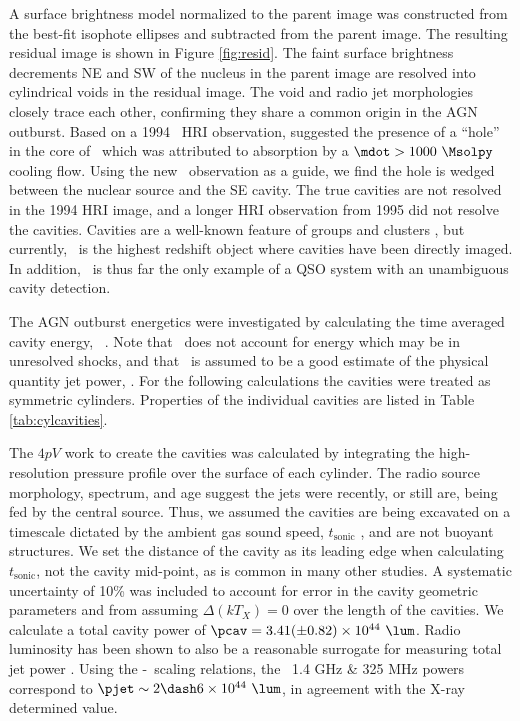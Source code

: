 \documentclass[useAMS,usenatbib]{mn2e}
\begin{document}
A surface brightness model normalized to the parent image was
constructed from the best-fit isophote ellipses and subtracted from
the parent image. The resulting residual image is shown in Figure
\ref{fig:resid}. The faint surface brightness decrements NE and SW of
the nucleus in the parent image are resolved into cylindrical voids in
the residual image. The void and radio jet morphologies closely trace
each other, confirming they share a common origin in the AGN
outburst. Based on a 1994 \rosat\ HRI observation,
\citet{1995MNRAS.274L..63F} suggested the presence of a ``hole'' in
the core of \rxj\ which was attributed to absorption by a $\mdot >
1000 ~\Msolpy$ cooling flow. Using the new \chandra\ observation as a
guide, we find the hole is wedged between the nuclear source and the
SE cavity. The true cavities are not resolved in the 1994 HRI image,
and a longer HRI observation from 1995 did not resolve the
cavities. Cavities are a well-known feature of groups and clusters
\citep[\eg][]{birzan04, 2005MNRAS.364.1343D}, but currently, \irs\ is
the highest redshift object where cavities have been directly
imaged. In addition, \irs\ is thus far the only example of a QSO
system with an unambiguous cavity detection.

The AGN outburst energetics were investigated by calculating the time
averaged cavity energy, \pcav\ \citep[see][for a
  review]{mcnamrev}. Note that \pcav\ does not account for energy
which may be in unresolved shocks, and that \pcav\ is assumed to be a
good estimate of the physical quantity jet power, \pjet. For the
following calculations the cavities were treated as symmetric
cylinders. Properties of the individual cavities are listed in Table
\ref{tab:cylcavities}.

The $4pV$ work to create the cavities was calculated by integrating
the high-resolution pressure profile over the surface of each
cylinder. The radio source morphology, spectrum, and age suggest the
jets were recently, or still are, being fed by the central
source. Thus, we assumed the cavities are being excavated on a
timescale dictated by the ambient gas sound speed,
$t_{\mathrm{sonic}}$ \citep[see][]{birzan04}, and are not buoyant
structures. We set the distance of the cavity as its leading edge when
calculating $t_{\mathrm{sonic}}$, not the cavity mid-point, as is
common in many other studies. A systematic uncertainty of 10\% was
included to account for error in the cavity geometric parameters and
from assuming $\Delta (kT_X) = 0$ over the length of the cavities. We
calculate a total cavity power of $\pcav = 3.41 (\pm 0.82) \times
10^{44} ~\lum$. Radio luminosity has been shown to also be a
reasonable surrogate for measuring total jet power
\citep{birzan08}. Using the \citet{pjet} \pjet-\prad\ scaling
relations, the \irs\ 1.4 GHz \& 325 MHz powers correspond to $\pjet
\sim 2 \dash 6 \times 10^{44} ~\lum$, in agreement with the X-ray
determined value.
\end{document}
